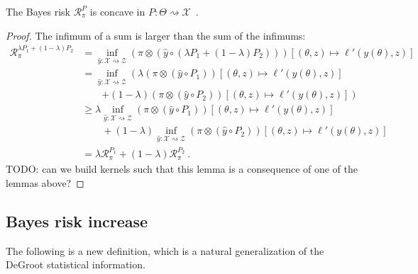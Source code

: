\begin{lemma}
  \label{lem:bayesRisk_concave}
  The Bayes risk $\mathcal R_\pi^P$ is concave in $P : \Theta \rightsquigarrow \mathcal X$~.
\end{lemma}

\begin{proof}%
\uses{}
The infimum of a sum is larger than the sum of the infimums:
\begin{align*}
\mathcal R_\pi^{\lambda P_1 + (1 - \lambda)P_2}
&= \inf_{\hat{y} : \mathcal X \rightsquigarrow \mathcal Z} (\pi \otimes (\hat{y} \circ (\lambda P_1 + (1 - \lambda)P_2)))\left[(\theta, z) \mapsto \ell'(y(\theta), z)\right]
\\
&= \inf_{\hat{y} : \mathcal X \rightsquigarrow \mathcal Z}  \left( \lambda (\pi \otimes (\hat{y} \circ P_1))\left[(\theta, z) \mapsto \ell'(y(\theta), z)\right] \right.
  \\&\qquad \left. + (1 - \lambda) (\pi \otimes (\hat{y} \circ P_2))\left[(\theta, z) \mapsto \ell'(y(\theta), z)\right] \right)
\\
&\ge \lambda \inf_{\hat{y} : \mathcal X \rightsquigarrow \mathcal Z} (\pi \otimes (\hat{y} \circ P_1))\left[(\theta, z) \mapsto \ell'(y(\theta), z)\right]
  \\&\qquad + (1 - \lambda) \inf_{\hat{y} : \mathcal X \rightsquigarrow \mathcal Z} (\pi \otimes (\hat{y} \circ P_2))\left[(\theta, z) \mapsto \ell'(y(\theta), z)\right]
\\
&= \lambda \mathcal R_\pi^{P_1} + (1 - \lambda)\mathcal R_\pi^{P_2}
\: .
\end{align*}
TODO: can we build kernels such that this lemma is a consequence of one of the lemmas above?
\end{proof}




\subsection{Bayes risk increase}

The following is a new definition, which is a natural generalization of the DeGroot statistical information.

